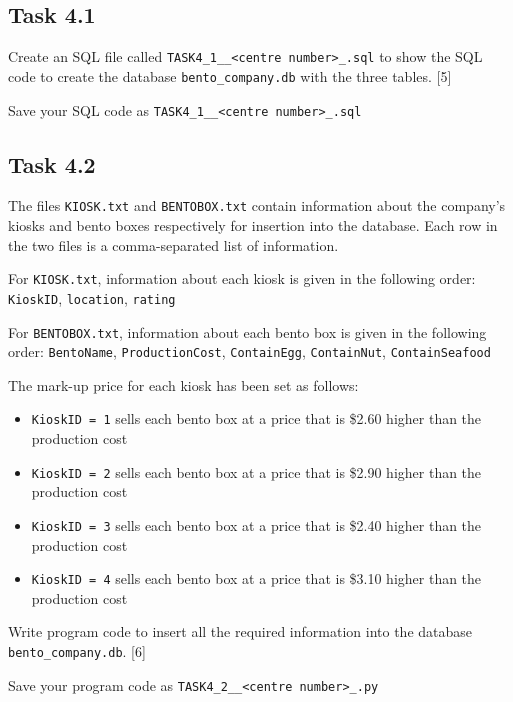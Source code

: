 \subsection*{Task 4.1}

\noindent Create an SQL file called \texttt{TASK4\_1\_<your name>\_<centre
number>\_<index number>.sql} to show the SQL code to create the database
\texttt{bento\_company.db} with the three tables. \hfill{}{[}5{]}

\noindent Save your SQL code as \texttt{TASK4\_1\_<your name>\_<centre
number>\_<index number>.sql}

\subsection*{Task 4.2}

\noindent The files \texttt{KIOSK.txt} and \texttt{BENTOBOX.txt} contain
information about the company\textquoteright s kiosks and bento boxes
respectively for insertion into the database. Each row in the two
files is a comma-separated list of information. 

\noindent For \texttt{KIOSK.txt}, information about each kiosk is
given in the following order: \texttt{KioskID}, \texttt{location},
\texttt{rating}

\noindent For \texttt{BENTOBOX.txt}, information about each bento
box is given in the following order: \texttt{BentoName}, \texttt{ProductionCost},
\texttt{ContainEgg}, \texttt{ContainNut}, \texttt{ContainSeafood}

\noindent The mark-up price for each kiosk has been set as follows:
\begin{itemize}
\item \texttt{KioskID = 1} sells each bento box at a price that is \$2.60
higher than the production cost
\item \texttt{KioskID = 2} sells each bento box at a price that is \$2.90
higher than the production cost 
\item \texttt{KioskID = 3} sells each bento box at a price that is \$2.40
higher than the production cost 
\item \texttt{KioskID = 4} sells each bento box at a price that is \$3.10
higher than the production cost
\end{itemize}
\noindent Write program code to insert all the required information
into the database \texttt{bento\_company.db}. \hfill{}{[}6{]}

\noindent Save your program code as \texttt{TASK4\_2\_<your name>\_<centre
number>\_<index number>.py}


